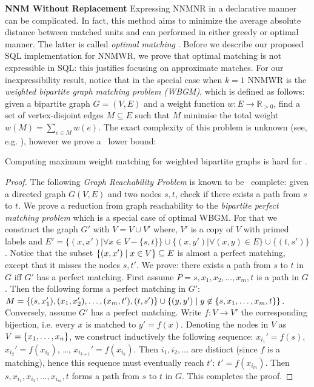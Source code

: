{\bf NNM Without Replacement} Expressing NNMNR in a declarative manner
can be complicated. In fact, this method aims
to minimize the average absolute distance between matched units and can performed in either greedy or optimal manner. The latter is called {\em optimal matching}
\cite{Rosenbaum93}. Before we describe our proposed SQL implementation for NNMWR, we prove
that optimal matching is not expressible in SQL: this justifies
focusing on approximate matches.  For our inexpressibility result,
notice that in the special case when $k=1$ NNMWR is the {\em weighted
  bipartite graph matching problem (WBGM)}, which is defined as
follows: given a bipartite graph $G=(V,E)$ and a weight function
$w: E \rightarrow \mathbb{R}_{>0}$, find a set of vertex-disjoint
edges $M \subseteq E$ such that $M$ minimise the total weight
$w(M) = \sum_{e \in M} w(e)$.  The exact complexity of this problem
is unknown (see, e.g. \cite{Avis83}), however we prove a \NLOGSPACE\
lower bound:


\begin{proposition} \label{pro:om}
Computing  maximum weight matching for  weighted bipartite graphs is hard for \NLOGSPACE.
\end{proposition}

\begin{proof} The following {\em Graph Reachability Problem} is known
  to be \NLOGSPACE\ complete: given a directed graph $G(V,E)$ and two
  nodes $s,t$, check if there exists a path from $s$ to $t$.  We prove
  a reduction from graph reachability to the {\em bipartite perfect
    matching problem} which is a special case of optimal WBGM. For
  that we construct the graph $G'$ with $V= V \cup V'$ where, $V'$ is
  a copy of $V$ with primed labels and
  $E'= \{(x,x')| \forall x \in V -\{s,t\} \} \cup \{(x,y')| \forall
  (x,y) \in E\} \cup \{(t,s')\}$.
  Notice that the subset $\{{(x,x')}\mid{x \in V}\} \subseteq E$ is
  almost a perfect matching, except that it misses the nodes $s, t'$.
  We prove: there exists a path from $s$ to $t$ in $G$ iff $G'$ has a
  perfect matching.  First assume $P=s, x_1, x_2, \ldots, x_m, t$ is a
  path in $G$. Then the following forms a perfect matching in $G'$:
  $M=\{(s,x_1'), (x_1,x_2'), \ldots, (x_{m},t'), (t,s')\} \cup
  \{{(y,y')}\mid{y \not\in \{s,x_1, \ldots, x_m,t\}}\}$.
  Conversely, assume $G'$ has a perfect matching. Write
  $f : V \rightarrow V'$ the corresponding bijection, i.e. every $x$
  is matched to $y'=f(x)$.  Denoting the nodes in $V$ as
  $V=\{x_1, \ldots, x_n\}$, we construct inductively the following
  sequence: $x_{i_1}' = f(s)$, $x_{i_2}' = f(x_{i_3})$, \ldots,
  $x_{i_{k+1}}' = f(x_{i_k})$.  Then $i_1, i_2, \ldots$ are distinct
  (since $f$ is a matching), hence this sequence must eventually reach
  $t'$: $t' = f(x_{i_m})$.  Then
  $s,x_{i_1},x_{i_2}, \ldots, x_{i_m}, t$ forms a path from $s$ to $t$
  in $G$.  This completes the proof.
\end{proof}

